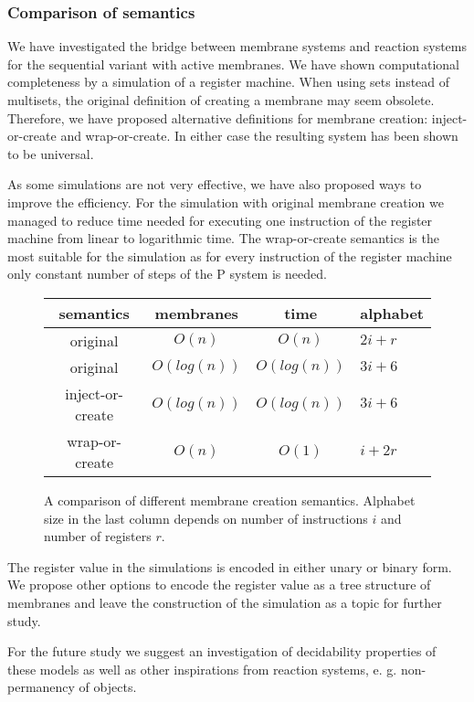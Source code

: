 
  \subsubsection{Comparison of semantics} %
  \label{ssub:comparison_of_semantics}
    
    We have investigated the bridge between membrane systems and reaction systems for the sequential variant with active membranes. We have shown computational completeness by a simulation of a register machine. When using sets instead of multisets, the original definition of creating a membrane may seem obsolete. Therefore, we have proposed alternative definitions for membrane creation: inject-or-create and wrap-or-create. In either case the resulting system has been shown to be universal.

    As some simulations are not very effective, we have also proposed ways to improve the efficiency. For the simulation with original membrane creation we managed to reduce time needed for executing one instruction of the register machine from linear to logarithmic time. The wrap-or-create semantics is the most suitable for the simulation as for every instruction of the register machine only constant number of steps of the P system is needed.

    \begin{figure}[h]
      \centering
      \begin{tabular}{|c|c|c|l|}
        \hline
        semantics & membranes & time & alphabet \\ \hline
        original & $O(n)$ & $O(n)$ & $2i+r$ \\ \hline
        original & $O(log(n))$ & $O(log(n))$ & $3i+6$ \\ \hline
        inject-or-create & $O(log(n))$ & $O(log(n))$ & $3i+6$ \\ \hline
        wrap-or-create & $O(n)$ & $O(1)$ & $i+2r$ \\ \hline
      \end{tabular}
      \caption{A comparison of different membrane creation semantics. Alphabet size in the last column depends on number of instructions $i$ and number of registers $r$.}
    \end{figure}

    The register value in the simulations is encoded in either unary or binary form. We propose other options to encode the register value as a tree structure of membranes and leave the construction of the simulation as a topic for further study.

    For the future study we suggest an investigation of decidability properties of these models as well as other inspirations from reaction systems, e. g. non-permanency of objects.


